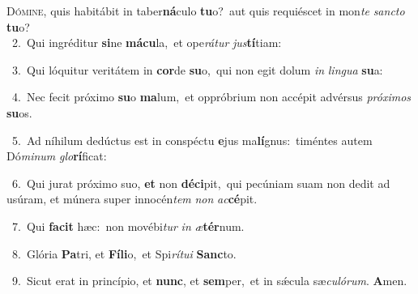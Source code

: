 \lettrine{\initial\textcolor{\initialcolor}{D}}{ómine,} quis habitábit in taber\-\textbf{ná}\-culo \textbf{tu}\-o?~\star aut quis requiéscet in mon\textit{te} \textit{sanc}\-\textit{to} \textbf{tu}\-o?\\
{\numbfont\textcolor{\numbcolor}{~2.}}~Qui ingréditur \textbf{si}\-ne \textbf{má}\-\textbf{cu}la,~\star et ope\-\textit{rá}\-\textit{tur} \textit{jus}\-\textbf{tí}tiam:\par
{\numbfont\textcolor{\numbcolor}{~3.}}~Qui lóquitur veritátem in \textbf{cor}\-de \textbf{su}\-o,~\star qui non egit dolum \textit{in} \textit{lin}\-\textit{gua} \textbf{su}\-a:\par
{\numbfont\textcolor{\numbcolor}{~4.}}~Nec fecit próximo \textbf{su}\-o \textbf{ma}\-lum,~\star et oppróbrium non accépit advérsus \textit{pró}\-\textit{xi}\textit{mos} \textbf{su}\-os.\par
{\numbfont\textcolor{\numbcolor}{~5.}}~Ad níhilum dedúctus est in conspéctu \textbf{e}\-jus ma\-\textbf{lí}\-gnus:~\star timéntes autem Dó\-\textit{mi}\-\textit{num} \textit{glo}\-\textbf{rí}ficat:\par
{\numbfont\textcolor{\numbcolor}{~6.}}~Qui jurat próximo suo, \textbf{et} non \textbf{dé}\-\textbf{ci}pit,~\star qui pecúniam suam non dedit ad usúram, et múnera super innocén\textit{tem} \textit{non} \textit{ac}\-\textbf{cé}pit.\par
{\numbfont\textcolor{\numbcolor}{~7.}}~Qui \textbf{fa}\-\textbf{cit} hæc:~\star non movébi\textit{tur} \textit{in} \textit{æ}\-\textbf{tér}num.\par
{\numbfont\textcolor{\numbcolor}{~8.}}~Glória \textbf{Pa}\-tri, et \textbf{Fí}\-\textbf{li}o,~\star et Spi\-\textit{rí}\-\textit{tu}\textit{i} \textbf{Sanc}\-to.\par
{\numbfont\textcolor{\numbcolor}{~9.}}~Sicut erat in princípio, et \textbf{nunc}\-, et \textbf{sem}\-per,~\star et in sǽcula sæ\-\textit{cu}\-\textit{ló}\textit{rum}. \textbf{A}\-men.\par
